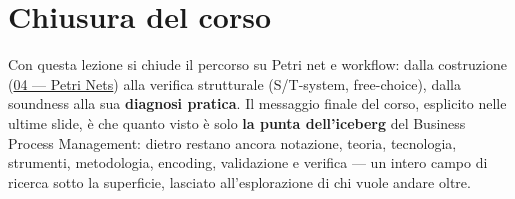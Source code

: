 \section{\texorpdfstring{Chiusura del corso}{Chiusura del corso}}

Con questa lezione si chiude il percorso su Petri net e workflow: dalla costruzione (\hyperref[ch:04]{04 — Petri Nets}) alla verifica strutturale (S/T-system, free-choice), dalla soundness alla sua \textbf{diagnosi pratica}. Il messaggio finale del corso, esplicito nelle ultime slide, è che quanto visto è solo \textbf{la punta dell'iceberg} del Business Process Management: dietro restano ancora notazione, teoria, tecnologia, strumenti, metodologia, encoding, validazione e verifica — un intero campo di ricerca sotto la superficie, lasciato all'esplorazione di chi vuole andare oltre.